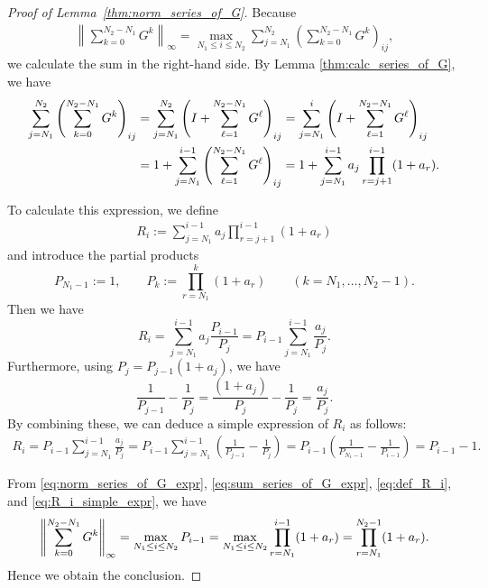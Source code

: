 \documentclass[pdflatex,sn-mathphys-num]{sn-jnl}%
\theoremstyle{thmstyleone}%
\theoremstyle{thmstyletwo}%
\theoremstyle{thmstylethree}%
\begin{document}
\begin{proof}[Proof of Lemma~\ref{thm:norm_series_of_G}]
Because
\begin{align}
\left\| 
\sum_{k=0}^{N_{2} - N_{1}} G^{k}
\right\|_{\infty}
= 
\max_{N_{1} \leq i \leq N_{2}} \sum_{j=N_{1}}^{N_{2}} 
\left( \sum_{k=0}^{N_{2} - N_{1}} G^{k} \right)_{ij},
\label{eq:norm_series_of_G_expr}
\end{align}
we calculate the sum in the right-hand side. 
By Lemma \ref{thm:calc_series_of_G}, 
we have
\begin{align}
\sum_{j=N_{1}}^{N_{2}} 
\left( \sum_{k=0}^{N_{2} - N_{1}} G^{k} \right)_{ij}
& = 
\sum_{j=N_{1}}^{N_{2}} 
\left( I + \sum_{\ell=1}^{N_{2} - N_{1}} G^{\ell} \right)_{ij}
= 
\sum_{j=N_{1}}^{i} 
\left( I + \sum_{\ell=1}^{N_{2} - N_{1}} G^{\ell} \right)_{ij}
\notag \\
& =
1 + 
\sum_{j=N_{1}}^{i-1} 
\left( \sum_{\ell=1}^{N_{2} - N_{1}} G^{\ell} \right)_{ij}
= 
1 + 
\sum_{j=N_{1}}^{i-1} 
a_j\prod_{r=j+1}^{i-1}(1+a_r).
\label{eq:sum_series_of_G_expr}
\end{align}

To calculate this expression, 
we define
\begin{align}
R_{i} 
:= 
\sum_{j=N_{1}}^{i-1} 
a_j\prod_{r=j+1}^{i-1}(1+a_r)
\label{eq:def_R_i}
\end{align}
and introduce the partial products
\[
P_{N_{1}-1}:=1, 
\qquad
P_k:=\prod_{r=N_{1}}^{k}(1+a_r)
\qquad
(k=N_{1}, \ldots, N_{2}-1). 
\]
Then we have
\[
R_i
=
\sum_{j=N_{1}}^{i-1} a_{j} \frac{P_{i-1}}{P_j}
=
P_{i-1}\sum_{j=N_{1}}^{i-1}\frac{a_j}{P_j}.
\]
Furthermore, 
using $P_j=P_{j-1}(1+a_j)$, we have
\[
\frac{1}{P_{j-1}}-\frac{1}{P_j}
=\frac{(1+a_j)}{P_{j}}-\frac{1}{P_{j}}
=\frac{a_j}{P_j}.
\]
By combining these, we can deduce a simple expression of $R_{i}$ as follows:
\begin{align}
R_{i}
=
P_{i-1}
\sum_{j=N_{1}}^{i-1}\frac{a_j}{P_j}
=
P_{i-1}
\sum_{j=N_{1}}^{i-1}\left( \frac{1}{P_{j-1}}-\frac{1}{P_j} \right)
=
P_{i-1}
\left( 
\frac{1}{P_{N_{1}-1}}-\frac{1}{P_{i-1}}
\right)
=P_{i-1} - 1.
\label{eq:R_i_simple_expr}
\end{align}

From 
\eqref{eq:norm_series_of_G_expr}, 
\eqref{eq:sum_series_of_G_expr}, 
\eqref{eq:def_R_i}, and
\eqref{eq:R_i_simple_expr}, 
we have
\begin{align}
\left\| 
\sum_{k=0}^{N_{2} - N_{1}} G^{k}
\right\|_{\infty}
=
\max_{N_{1} \leq i \leq N_{2}} P_{i-1}
=
\max_{N_{1} \leq i \leq N_{2}} \prod_{r=N_{1}}^{i-1}(1+a_r)
=
\prod_{r=N_{1}}^{N_{2}-1}(1+a_r).
\notag
\end{align}
Hence we obtain the conclusion. 
\end{proof}
\end{document}
